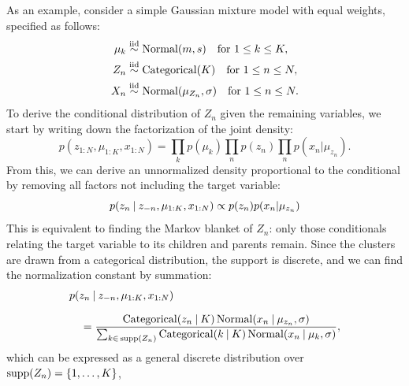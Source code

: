 As an example, consider a simple Gaussian mixture model with equal weights, specified as follows:
\begin{equation}
  \label{eq:normal-mixture-1}
  \begin{aligned}
    \mu_{k} &\stackrel{\text{iid}}{\sim} \mathrm{Normal}(m, s) \quad\text{for } 1 \le k \le K, \\
    Z_{n} &\stackrel{\text{iid}}{\sim} \mathrm{Categorical}(K) \quad\text{for } 1 \le n \le N, \\
    X_{n} &\stackrel{\text{iid}}{\sim} \mathrm{Normal}(\mu_{Z_{n}}, \sigma) \quad\text{for } 1 \le n \le N.
  \end{aligned}
\end{equation}
To derive the conditional distribution of \(Z_{n}\) given the remaining variables, we start by
writing down the factorization of the joint density:
\begin{equation}
  p(z_{1:N}, \mu_{1:K}, x_{1:N}) = \prod_{k} p(\mu_{k}) \prod_{n} p(z_{n}) \prod_{n} p(x_{n} | \mu_{z_{n}}).
\end{equation}
From this, we can derive an unnormalized density proportional to the conditional by removing all
factors not including the target variable:
\begin{equation}
    p(z_{n} \:\vert\: z_{-n}, \mu_{1:K}, x_{1:N}) \propto p(z_{n}) p(x_{n} | \mu_{z_{n}})
\end{equation}
This is equivalent to finding the Markov blanket of \(Z_{n}\): only those conditionals relating the
target variable to its children and parents remain.  Since the clusters are drawn from a categorical
distribution, the support is discrete, and we can find the normalization constant by summation:
\begin{equation}
  \setlength{\jot}{0.8\baselineskip}
  \begin{aligned}
    &p(z_{n} \given z_{-n}, \mu_{1:K}, x_{1:N}) \\
    &\quad = \dfrac{\distr{Categorical}(z_{n} \given K) \, \Normal(x_{n} \given \mu_{z_{n}}, \sigma)}{
      \sum_{k \in\, \supp(Z_{n})} \distr{Categorical}(k \given K)\, \Normal(x_{n} \given \mu_{k},
      \sigma)}, \\
  \end{aligned}
\end{equation}
which can be expressed as a general discrete distribution over \(\operatorname{supp}(Z_{n}) = \{1, \ldots, K\}\),
